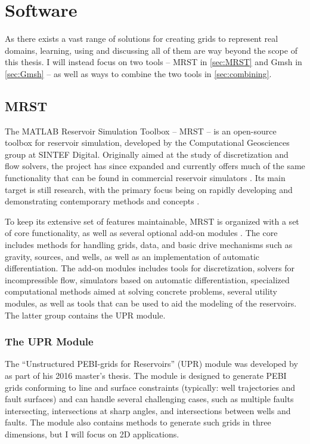 \section{Software}
As there exists a vast range of solutions for creating grids to represent real domains, learning, using and discussing all of them are way beyond the scope of this thesis. I will instead focus on two tools -- MRST in \autoref{sec:MRST} and Gmsh in \autoref{sec:Gmsh} -- as well as ways to combine the two tools in \autoref{sec:combining}. 

\subsection{MRST}
\label{sec:MRST}
The MATLAB Reservoir Simulation Toolbox -- MRST -- is an open-source toolbox for reservoir simulation, developed by the Computational Geosciences group at SINTEF Digital. Originally aimed at the study of discretization and flow solvers, the project has since expanded and currently offers much of the same functionality that can be found in commercial reservoir simulators \cite{MRST_book}. Its main target is still research, with the primary focus being on rapidly developing and demonstrating contemporary methods and concepts \cite{MRST_website}.

To keep its extensive set of features maintainable, MRST is organized with a set of core functionality, as well as several optional add-on modules \cite{MRST_book}. The core includes methods for handling grids, data, and basic drive mechanisms such as gravity, sources, and wells, as well as an implementation of automatic differentiation. The add-on modules includes tools for discretization, solvers for incompressible flow, simulators based on automatic differentiation, specialized computational methods aimed at solving concrete problems, several utility modules, as well as tools that can be used to aid the modeling of the reservoirs. The latter group contains the UPR module.


\subsubsection{The UPR Module}
\label{sec:UPR}
The ``Unstructured PEBI-grids for Reservoirs'' (UPR) module was developed by \textcite{UPR_thesis} as part of his 2016 master's thesis. The module is designed to generate PEBI grids conforming to line and surface constraints (typically: well trajectories and fault surfaces) and can handle several challenging cases, such as multiple faults intersecting, intersections at sharp angles, and intersections between wells and faults. The module also contains methods to generate such grids in three dimensions, but I will focus on 2D applications.


